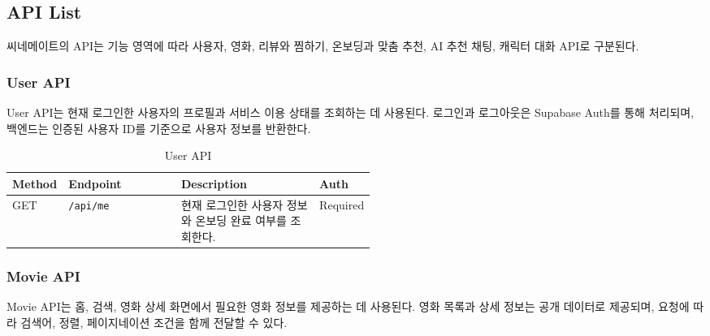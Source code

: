 \documentclass[11pt,a4paper]{article}
\renewcommand{\arraystretch}{1.18}
\begin{document}
\hypertarget{api-list}{%
\subsection{API List}\label{api-list}}

씨네메이트의 API는 기능 영역에 따라 사용자, 영화, 리뷰와 찜하기, 온보딩과 맞춤 추천, AI 추천 채팅, 캐릭터 대화 API로 구분된다.

\hypertarget{user-api}{%
\subsubsection{User API}\label{user-api}}

User API는 현재 로그인한 사용자의 프로필과 서비스 이용 상태를 조회하는 데 사용된다. 로그인과 로그아웃은 Supabase Auth를 통해 처리되며, 백엔드는 인증된 사용자 ID를 기준으로 사용자 정보를 반환한다.

\begin{table}[H]
\centering
\footnotesize
\setlength{\tabcolsep}{5pt}
\renewcommand{\arraystretch}{1.28}
\begin{tabularx}{\linewidth}{@{}>{\RaggedRight\arraybackslash}p{0.10\linewidth}>{\RaggedRight\arraybackslash}p{0.31\linewidth}>{\RaggedRight\arraybackslash}X>{\RaggedRight\arraybackslash}p{0.11\linewidth}@{}}
\toprule
\textbf{Method} & \textbf{Endpoint} & \textbf{Description} & \textbf{Auth} \\
\midrule
GET & \texttt{/\allowbreak{}api/\allowbreak{}me} & 현재 로그인한 사용자 정보와 온보딩 완료 여부를 조회한다. & Required \\
\bottomrule
\end{tabularx}
\caption{User API}
\end{table}

\hypertarget{movie-api}{%
\subsubsection{Movie API}\label{movie-api}}

Movie API는 홈, 검색, 영화 상세 화면에서 필요한 영화 정보를 제공하는 데 사용된다. 영화 목록과 상세 정보는 공개 데이터로 제공되며, 요청에 따라 검색어, 정렬, 페이지네이션 조건을 함께 전달할 수 있다.
\end{document}
